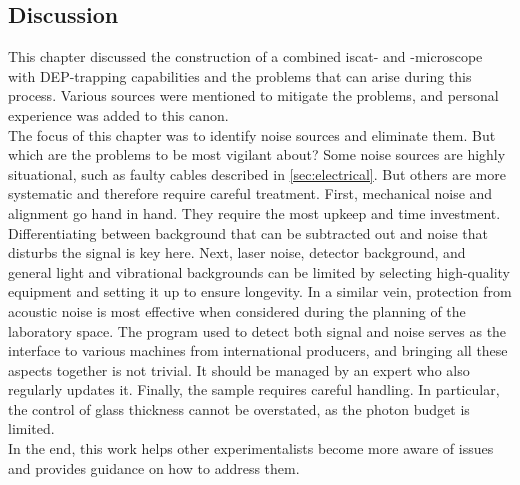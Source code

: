 \subsection*{Discussion}
This chapter discussed the construction of a combined \gls{iscat}- and \fl-microscope with \gls{DEP}-trapping capabilities and the problems that can arise during this process. Various sources were mentioned to mitigate the problems, and personal experience was added to this canon.\\
The focus of this chapter was to identify noise sources and eliminate them. But which are the problems to be most vigilant about? Some noise sources are highly situational, such as faulty cables described in \ref{sec:electrical}. But others are more systematic and therefore require careful treatment. First, mechanical noise and alignment go hand in hand. They require the most upkeep and time investment. Differentiating between background that can be subtracted out and noise that disturbs the signal is key here. Next, laser noise, detector background, and general light and vibrational backgrounds can be limited by selecting high-quality equipment and setting it up to ensure longevity. In a similar vein, protection from acoustic noise is most effective when considered during the planning of the laboratory space. The program used to detect both signal and noise serves as the interface to various machines from international producers, and bringing all these aspects together is not trivial. It should be managed by an expert who also regularly updates it. Finally, the sample requires careful handling. In particular, the control of glass thickness cannot be overstated, as the photon budget is limited.\\
In the end, this work helps other experimentalists become more aware of issues and provides guidance on how to address them. 


